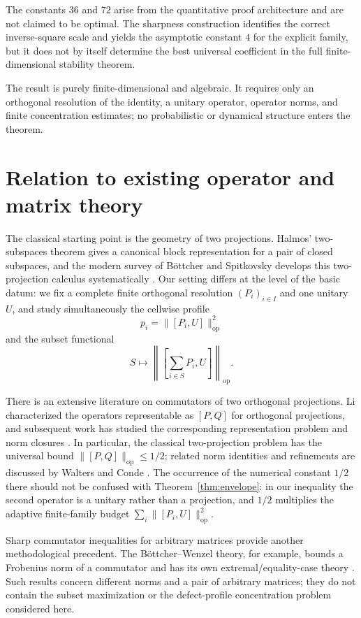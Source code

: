 \documentclass[11pt]{article}
\newcommand{\op}{\mathrm{op}}
\begin{document}
The constants $36$ and $72$ arise from the quantitative proof architecture
and are not claimed to be optimal.  The sharpness construction identifies the
correct inverse-square scale and yields the asymptotic constant $4$ for the
explicit family, but it does not by itself determine the best universal
coefficient in the full finite-dimensional stability theorem.

The result is purely finite-dimensional and algebraic.  It requires only an
orthogonal resolution of the identity, a unitary operator, operator norms,
and finite concentration estimates; no probabilistic or dynamical structure
enters the theorem.

\section{Relation to existing operator and matrix theory}
\label{sec:related}

The classical starting point is the geometry of two projections.  Halmos'
two-subspaces theorem gives a canonical block representation for a pair of
closed subspaces, and the modern survey of B{\"o}ttcher and Spitkovsky
develops this two-projection calculus systematically
\cite{Halmos1969TwoSubspaces,BottcherSpitkovsky2010}.  Our setting differs at
the level of the basic datum: we fix a complete finite orthogonal resolution
$(P_i)_{i\in I}$ and one unitary $U$, and study simultaneously the cellwise
profile
\[
  p_i=\|[P_i,U]\|_{\op}^2
\]
and the subset functional
\[
  S\longmapsto
  \left\|
    \left[\sum_{i\in S}P_i,U\right]
  \right\|_{\op}.
\]

There is an extensive literature on commutators of two orthogonal
projections.  Li characterized the operators representable as
$[P,Q]$ for orthogonal projections, and subsequent work has studied the
corresponding representation problem and norm closures
\cite{Li2004,ShiJi2019,MarcouxRadjaviZhang2024}.  In particular, the
classical two-projection problem has the universal bound
$\|[P,Q]\|_{\op}\le1/2$; related norm identities and refinements are discussed
by Walters and Conde \cite{Conde2022}.  The occurrence of the numerical
constant $1/2$ there should not be confused with
Theorem~\ref{thm:envelope}: in our inequality the second operator is a
unitary rather than a projection, and $1/2$ multiplies the adaptive
finite-family budget
$\sum_i\|[P_i,U]\|_{\op}^2$.

Sharp commutator inequalities for arbitrary matrices provide another
methodological precedent.  The B{\"o}ttcher--Wenzel theory, for example,
bounds a Frobenius norm of a commutator and has its own extremal/equality-case
theory \cite{BottcherWenzel2008}.  Such results concern different norms and a
pair of arbitrary matrices; they do not contain the subset maximization or
the defect-profile concentration problem considered here.
\end{document}
